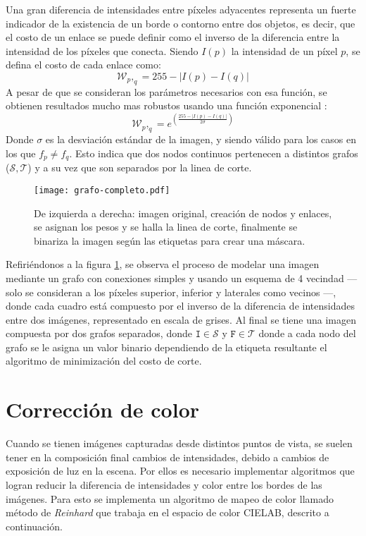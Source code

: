 Una gran diferencia de intensidades entre píxeles adyacentes representa un fuerte indicador de la existencia de un borde o contorno entre dos objetos, es decir, que el costo de un enlace se puede definir como el inverso de la diferencia entre la intensidad de los píxeles que conecta. Siendo $I(p)$ la intensidad de un píxel $p$, se defina el costo de cada enlace como:
\begin{equation}
\mathcal{W}_p,_q = 255 - |I(p) - I (q)|
\label{costo-corte}
\end{equation}
A pesar de que se consideran los parámetros necesarios con esa función, se obtienen resultados mucho mas robustos usando una función exponencial \cite{graph-opencv}:
\begin{equation}
\mathcal{W}_p,_q = e^{\left(\frac{255-|I(p) - I (q)|}{2 \sigma}  \right) }
\label{costo-corte}
\end{equation}
Donde $\sigma$ es la desviación estándar de la imagen, y siendo válido para los casos en los que $f_p \neq f_q$. Esto indica que dos nodos continuos pertenecen a distintos grafos ($\mathcal{S,T}$) y a su vez que son separados por la linea de corte.

\begin{figure}[h]
	\centering
	\texttt{[image: grafo-completo.pdf]}
	\caption[Corte por grafo]{De izquierda a derecha: imagen original, creación de nodos y enlaces, se asignan los pesos y se halla la linea de corte, finalmente se binariza la imagen según las etiquetas para crear una máscara.}
	\label{imagen:grafo}
\end{figure}

Refiriéndonos a la figura \ref{imagen:grafo}, se observa el proceso de modelar una imagen mediante un grafo con conexiones simples y usando un esquema de 4 vecindad --- solo se consideran a los píxeles superior, inferior y laterales como vecinos ---, donde cada cuadro está compuesto por el inverso de la diferencia de intensidades entre dos imágenes, representado en escala de grises. Al final se tiene una imagen compuesta por dos grafos separados, donde $\mathtt{I} \in \mathcal{S}$ y $\mathtt{F} \in \mathcal{T}$ donde a cada nodo del grafo se le asigna un valor binario dependiendo de la etiqueta resultante el algoritmo de minimización del costo de corte.


\section{Corrección de color}\label{seccion-color}
Cuando se tienen imágenes capturadas desde distintos puntos de vista, se suelen tener en la composición final cambios de intensidades, debido a cambios de exposición de luz en la escena. Por ellos es necesario implementar algoritmos que logran reducir la diferencia de intensidades y color entre los bordes de las imágenes. Para esto se implementa un algoritmo de mapeo de color llamado método de \textit{Reinhard} \cite{reinhard} que trabaja en el espacio de color CIELAB, descrito a continuación. 

